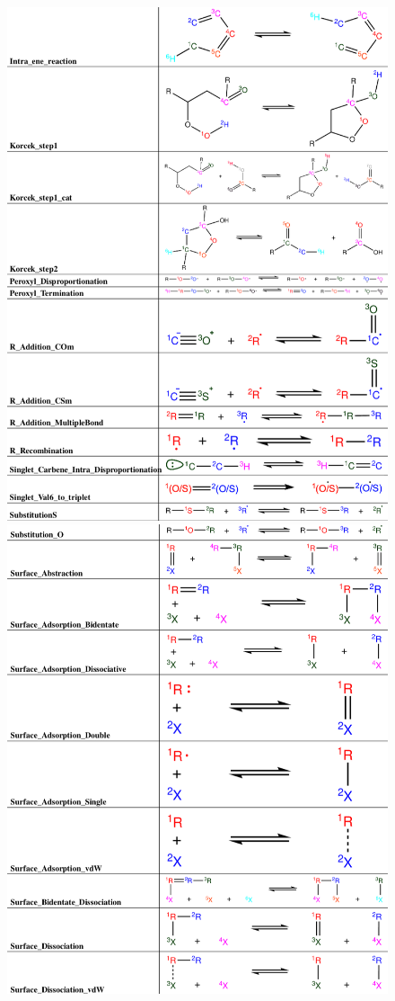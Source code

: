  \begin{figure}
     \centering
     \includegraphics[scale=0.5, keepaspectratio]{images/rxn_fam5.png}
     \includegraphics[scale=0.5, keepaspectratio]{images/rxn_fam6.png}

\end{figure}
